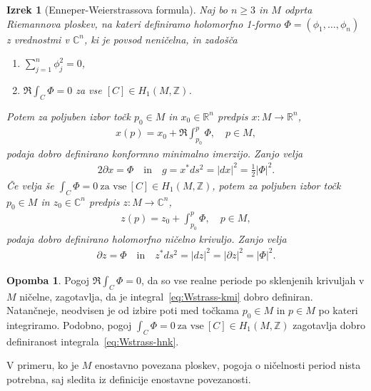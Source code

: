 \documentclass[12pt,a4paper,twoside]{article}
\theoremstyle{definition} %
\newtheorem{opomba}[definicija]{Opomba}
\theoremstyle{plain} %
\newtheorem{izrek}[definicija]{Izrek}
\numberwithin{equation}{section}  %
\newcommand{\R}{\mathbb R}
\newcommand{\Z}{\mathbb Z}
\newcommand{\C}{\mathbb C}
\begin{document}
\begin{izrek}[Enneper-Weierstrassova formula] \label{izr:Enneper-Weierstrass}
Naj bo $n \geq 3$ in $M$ odprta Riemannova ploskev, na kateri definiramo holomorfno 1-formo $\Phi = (\phi_{1}, \dots , \phi_{n})$ z vrednostmi v $\C^{n}$, ki je povsod neničelna, in zadošča 
\begin{enumerate}
\item $ \sum_{j=1}^{n} \phi_{j}^{2} = 0$,
\item $ \Re \int_{C} \Phi = 0 $ za vse $[C] \in H_{1} (M, \Z)$.
\end{enumerate}
Potem za poljuben izbor točk $p_0 \in M$ in $x_0 \in \R^{n}$ predpis $x \colon M \to \R^{n}$,
\begin{align} \label{eq:Wstrass-kmi}
x(p) = x_0 + \Re \int_{p_0}^{p} \Phi, \quad p \in M,
\end{align}
podaja dobro definirano konformno minimalno imerzijo. Zanjo velja
\begin{align}
2 \partial{x} = \Phi \quad \text{in} \quad g = x^{*} ds^2 = |dx|^2 = \frac{1}{2} |\Phi|^2.
\end{align}
%
Če velja še
$ \int_{C} \Phi = 0 \ \text{za vse} \ [C] \in H_{1} (M, \Z) $,
potem za poljuben izbor točk $p_0 \in M$ in $z_0 \in \C^{n}$ predpis $z \colon M \to \C^{n}$,
\begin{align} \label{eq:Wstrass-hnk}
z(p) = z_0 + \int_{p_0}^{p} \Phi, \quad p \in M,
\end{align}
podaja dobro definirano holomorfno ničelno krivuljo. Zanjo velja
\begin{align}
\partial{z} = \Phi \quad \text{in} \quad z^{*} ds^2 = |dz|^2 = |\partial{z}|^2 = |\Phi|^2.
\end{align}
\end{izrek}

\begin{opomba}
Pogoj $ \Re \int_{C} \Phi = 0 $, da so vse realne periode po sklenjenih krivuljah v $M$ ničelne, zagotavlja, da je integral~\ref{eq:Wstrass-kmi} dobro definiran.
Natančneje, neodvisen je od izbire poti med točkama $p_0 \in M$ in $p \in M$ po kateri integriramo.
Podobno, pogoj $ \int_{C} \Phi = 0 \ \text{za vse} \ [C] \in H_{1} (M, \Z) $ zagotavlja dobro definiranost integrala~\ref{eq:Wstrass-hnk}. 

V primeru, ko je $M$ enostavno povezana ploskev, pogoja o ničelnosti period nista potrebna, saj sledita iz definicije enostavne povezanosti. 
\end{opomba}
\end{document}
